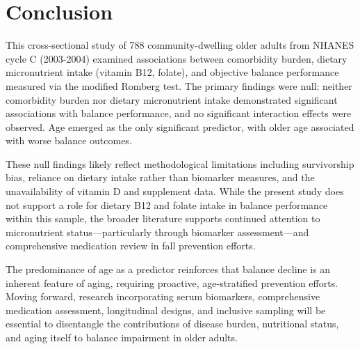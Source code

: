 \documentclass[11pt,a4paper]{article}
\begin{document}
\section{Conclusion}

This cross-sectional study of 788 community-dwelling older adults from NHANES cycle C (2003-2004) examined associations between comorbidity burden, dietary micronutrient intake (vitamin B12, folate), and objective balance performance measured via the modified Romberg test. The primary findings were null: neither comorbidity burden nor dietary micronutrient intake demonstrated significant associations with balance performance, and no significant interaction effects were observed. Age emerged as the only significant predictor, with older age associated with worse balance outcomes.

These null findings likely reflect methodological limitations including survivorship bias, reliance on dietary intake rather than biomarker measures, and the unavailability of vitamin D and supplement data. While the present study does not support a role for dietary B12 and folate intake in balance performance within this sample, the broader literature supports continued attention to micronutrient status—particularly through biomarker assessment—and comprehensive medication review in fall prevention efforts.

The predominance of age as a predictor reinforces that balance decline is an inherent feature of aging, requiring proactive, age-stratified prevention efforts. Moving forward, research incorporating serum biomarkers, comprehensive medication assessment, longitudinal designs, and inclusive sampling will be essential to disentangle the contributions of disease burden, nutritional status, and aging itself to balance impairment in older adults.



\end{document}
